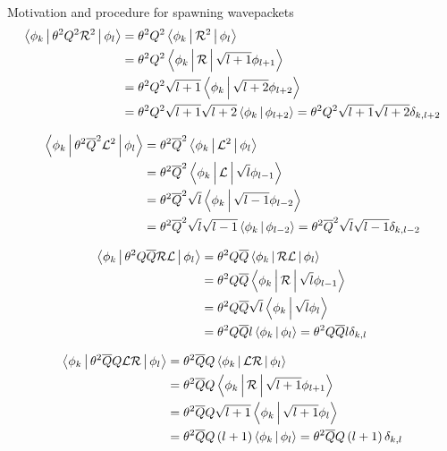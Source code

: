\begin{chapter}{Motivation and procedure for spawning wavepackets}
\begin{equation*}
\begin{split}
  \Braket{\phi_k | \theta^2 Q^2 \mathcal{R}^2 | \phi_l} & = \theta^2 Q^2 \Braket{\phi_k | \mathcal{R}^2 | \phi_l} \\
  & = \theta^2 Q^2 \Braket{\phi_k | \mathcal{R} | \sqrt{l+1} \phi_{l+1}} \\
  & = \theta^2 Q^2 \sqrt{l+1} \Braket{\phi_k | \sqrt{l+2} \phi_{l+2}} \\
  & = \theta^2 Q^2 \sqrt{l+1} \sqrt{l+2} \Braket{\phi_k | \phi_{l+2}}
    = \theta^2 Q^2 \sqrt{l+1} \sqrt{l+2} \delta_{k,l+2}
\end{split}
\end{equation*}

\begin{equation*}
\begin{split}
  \Braket{\phi_k | \theta^2 \overline{Q}^2 \mathcal{L}^2 | \phi_l} & = \theta^2 \overline{Q}^2 \Braket{\phi_k | \mathcal{L}^2 | \phi_l} \\
  & = \theta^2 \overline{Q}^2 \Braket{\phi_k | \mathcal{L} | \sqrt{l} \phi_{l-1}} \\
  & = \theta^2 \overline{Q}^2 \sqrt{l} \Braket{\phi_k | \sqrt{l-1} \phi_{l-2}} \\
  & = \theta^2 \overline{Q}^2 \sqrt{l} \sqrt{l-1} \Braket{\phi_k | \phi_{l-2}}
    = \theta^2 \overline{Q}^2 \sqrt{l} \sqrt{l-1} \delta_{k,l-2}
\end{split}
\end{equation*}

\begin{equation*}
\begin{split}
  \Braket{\phi_k | \theta^2 Q\overline{Q} \mathcal{RL} | \phi_l} & = \theta^2 Q\overline{Q} \Braket{\phi_k | \mathcal{RL} | \phi_l} \\
  & = \theta^2 Q\overline{Q} \Braket{\phi_k | \mathcal{R} | \sqrt{l} \phi_{l-1}} \\
  & = \theta^2 Q\overline{Q} \sqrt{l} \Braket{\phi_k | \sqrt{l} \phi_{l}} \\
  & = \theta^2 Q\overline{Q} l \Braket{\phi_k | \phi_{l}}
    = \theta^2 Q\overline{Q} l \delta_{k,l}
\end{split}
\end{equation*}

\begin{equation*}
\begin{split}
  \Braket{\phi_k | \theta^2 \overline{Q}Q \mathcal{LR} | \phi_l} & = \theta^2 \overline{Q}Q \Braket{\phi_k | \mathcal{LR} | \phi_l} \\
  & = \theta^2 \overline{Q}Q \Braket{\phi_k | \mathcal{R} | \sqrt{l+1} \phi_{l+1}} \\
  & = \theta^2 \overline{Q}Q \sqrt{l+1} \Braket{\phi_k | \sqrt{l+1} \phi_{l}} \\
  & = \theta^2 \overline{Q}Q \left(l+1\right) \Braket{\phi_k | \phi_{l}}
    = \theta^2 \overline{Q}Q \left(l+1\right) \delta_{k,l}
\end{split}
\end{equation*}


\end{chapter}
